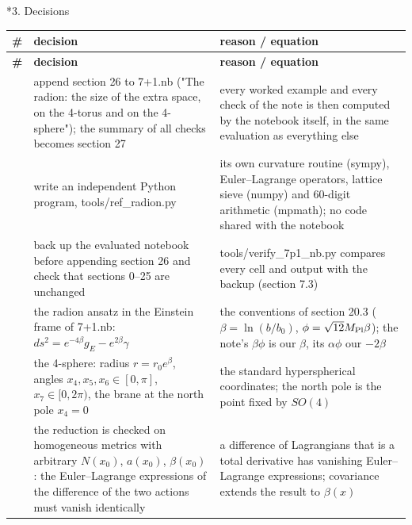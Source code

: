 \documentclass[10pt,a4paper]{article}
\makeatletter
\renewcommand\section{\@startsection{section}{1}{\z@}{-3.5ex \@plus -1ex \@minus -.2ex}{2.3ex \@plus.2ex}{\normalfont\Large\bfseries\raggedright}}
\makeatother
\begin{document}
\section*{3. Decisions}
{\footnotesize
\begin{longtable}{>{\raggedright\arraybackslash}p{}>{\raggedright\arraybackslash}p{}>{\raggedright\arraybackslash}p{}}
\toprule
\textbf{\#} & \textbf{decision} & \textbf{reason / equation} \\
\midrule\endfirsthead
\toprule
\textbf{\#} & \textbf{decision} & \textbf{reason / equation} \\
\midrule\endhead
\endfoot
\bottomrule\endlastfoot
1 & append section 26 to 7+1.nb ("The radion: the size of the extra space, on the 4-torus and on the 4-sphere"); the summary of all checks becomes section 27 & every worked example and every check of the note is then computed by the notebook itself, in the same evaluation as everything else \\
2 & write an independent Python program, tools/ref\_radion.py & its own curvature routine (sympy), Euler–Lagrange operators, lattice sieve (numpy) and 60-digit arithmetic (mpmath); no code shared with the notebook \\
3 & back up the evaluated notebook before appending section 26 and check that sections 0–25 are unchanged & tools/verify\_7p1\_nb.py compares every cell and output with the backup (section 7.3) \\
4 & the radion ansatz in the Einstein frame of 7+1.nb: $ds^2=e^{-4\beta}g_E-e^{2\beta}\gamma$ & the conventions of section 20.3 ($\beta=\ln(b/b_0)$, $\phi=\sqrt{12}M_{\rm Pl}\beta$); the note’s $\beta\phi$ is our $\beta$, its $\alpha\phi$ our $-2\beta$ \\
5 & the 4-sphere: radius $r=r_0e^\beta$, angles $x_4,x_5,x_6\in[0,\pi]$, $x_7\in[0,2\pi)$, the brane at the north pole $x_4=0$ & the standard hyperspherical coordinates; the north pole is the point fixed by $SO(4)$ \\
6 & the reduction is checked on homogeneous metrics with arbitrary $N(x_0)$, $a(x_0)$, $\beta(x_0)$: the Euler–Lagrange expressions of the difference of the two actions must vanish identically & a difference of Lagrangians that is a total derivative has vanishing Euler–Lagrange expressions; covariance extends the result to $\beta(x)$ \\

\end{longtable}}
\end{document}
